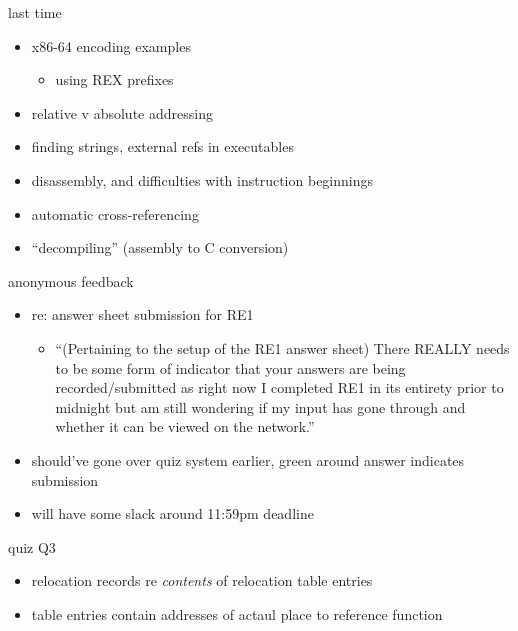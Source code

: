 \date{}
\title{}
\date{}

\begin{frame}
    \titlepage
\end{frame}



\begin{frame}{last time}
    \begin{itemize}
    \item x86-64 encoding examples
        \begin{itemize}
        \item using REX prefixes
        \end{itemize}
    \item relative v absolute addressing
    \vspace{.5cm}
    \item finding strings, external refs in executables
    \item disassembly, and difficulties with instruction beginnings
    \item automatic cross-referencing
    \item ``decompiling'' (assembly to C conversion)
    \end{itemize}
\end{frame}

\begin{frame}{anonymous feedback}
    \begin{itemize}
    \item re: answer sheet submission for RE1
        \begin{itemize}
        \item ``(Pertaining to the setup of the RE1 answer sheet) There REALLY needs to be some form of indicator that your answers are being recorded/submitted as right now I completed RE1 in its entirety prior to midnight but am still wondering if my input has gone through and whether it can be viewed on the network.''
        \end{itemize}
    \item should've gone over quiz system earlier, green around answer indicates submission
    \item will have some slack around 11:59pm deadline
    \end{itemize}
\end{frame}

\begin{frame}[fragile]{quiz Q3}
    \begin{itemize}
    \item relocation records re \textit{contents} of relocation table entries
    \item table entries contain addresses of actaul place to reference function
    \end{itemize}
\end{frame}

